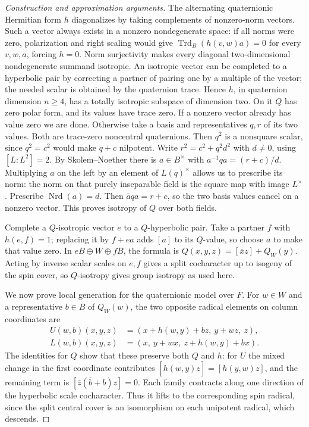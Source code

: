 \documentclass[11pt,a4paper,openany,oneside]{book}
\theoremstyle{resultstyle}
\theoremstyle{definition}
\numberwithin{equation}{chapter}
\begin{document}
\begin{proof}[Construction and approximation arguments]
The alternating quaternionic Hermitian form \(h\) diagonalizes
by taking complements of nonzero-norm vectors. Such a vector
always exists in a nonzero nondegenerate space: if all norms
were zero, polarization and right scaling would give
\(\operatorname{Trd}_B(h(v,w)a)=0\) for every \(v,w,a\), forcing
\(h=0\). Norm surjectivity makes every diagonal two-dimensional
nondegenerate summand isotropic. An isotropic vector can be
completed to a hyperbolic pair by correcting a partner of
pairing one by a multiple of the vector; the needed scalar is
obtained by the quaternion trace. Hence \(h\), in quaternion
dimension \(n\ge4\), has a totally isotropic subspace of dimension
two. On it \(Q\) has zero polar form, and its values have trace
zero. If a nonzero vector already has value zero we are done.
Otherwise take a basis and representatives \(q,r\) of its two
values. Both are trace-zero noncentral quaternions. Then \(q^2\)
is a nonsquare scalar, since \(q^2=c^2\) would make \(q+c\)
nilpotent. Write \(r^2=c^2+q^2 d^2\) with \(d\ne0\), using
\([L:L^2]=2\). By Skolem--Noether there is \(a\in B^\times\)
with \(a^{-1}qa=(r+c)/d\). Multiplying \(a\) on the left by
an element of \(L(q)^\times\) allows us to prescribe its norm:
the norm on that purely inseparable field is the square map
with image \(L^\times\). Prescribe \(\operatorname{Nrd}(a)=d\).
Then \(\bar a q a=r+c\), so the two basis values cancel on
a nonzero vector. This proves isotropy of \(Q\) over both fields.

Complete a \(Q\)-isotropic vector \(e\) to a \(Q\)-hyperbolic
pair. Take a partner \(f\) with \(h(e,f)=1\); replacing it by
\(f+ea\) adds \([a]\) to its \(Q\)-value, so choose \(a\) to
make that value zero. In \(eB\oplus W\oplus fB\), the formula is
\(Q(x,y,z)=[\bar xz]+Q_W(y)\). Acting by inverse scalar scales on
\(e,f\) gives a split cocharacter up to isogeny of the spin cover,
so \(Q\)-isotropy gives group isotropy as used here.

We now prove local generation for the quaternionic model over \(F\).
For \(w\in W\) and a representative \(b\in B\) of \(Q_W(w)\), the
two opposite radical elements on column coordinates are
\[
\begin{split}
 U(w,b)(x,y,z)&=(x+h(w,y)+bz,\ y+wz,\ z),\\
 L(w,b)(x,y,z)&=(x,\ y+wx,\ z+h(w,y)+bx).
\end{split}
\]
The identities for \(Q\) show that these preserve both \(Q\)
and \(h\): for \(U\) the mixed change in the first coordinate
contributes \([\overline{h(w,y)}z]=[h(y,w)z]\), and the remaining
term is \([\bar z(\bar b+b)z]=0\). Each family contracts along
one direction of the hyperbolic scale cocharacter. Thus it lifts
to the corresponding spin radical, since the split central cover
is an isomorphism on each unipotent radical, which descends.


\end{proof}
\end{document}
